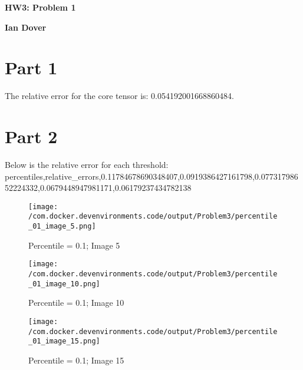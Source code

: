 \documentclass{article}%
\begin{document}
%
\normalsize%
\pagestyle{header}%
\begin{minipage}{\textwidth}%
\centering%
\begin{Large}%
\textbf{HW3: Problem 1}%
\end{Large}%
\linebreak%
\begin{large}%
\textbf{Ian Dover}%
\end{large}%
\end{minipage}%
\section{Part 1}%
\label{sec:Part1}%
The relative error for the core tensor is: 0.054192001668860484.\newline%
\newline%
\newline%

%
\section{Part 2}%
\label{sec:Part2}%
Below is the relative error for each threshold:\newline%
%
percentiles,relative\_errors,0.11784678690348407,0.0919386427161798,0.07731798652224332,0.0679448947981171,0.06179237434782138\newline%
\newline%
\newline%
%


\begin{figure}[h!]%
\centering%
\texttt{[image: /com.docker.devenvironments.code/output/Problem3/percentile\_01\_image\_5.png]}%
\caption{Percentile = 0.1; Image 5}%
\end{figure}

%


\begin{figure}[h!]%
\centering%
\texttt{[image: /com.docker.devenvironments.code/output/Problem3/percentile\_01\_image\_10.png]}%
\caption{Percentile = 0.1; Image 10}%
\end{figure}

%


\begin{figure}[h!]%
\centering%
\texttt{[image: /com.docker.devenvironments.code/output/Problem3/percentile\_01\_image\_15.png]}%
\caption{Percentile = 0.1; Image 15}%
\end{figure}
\end{document}
